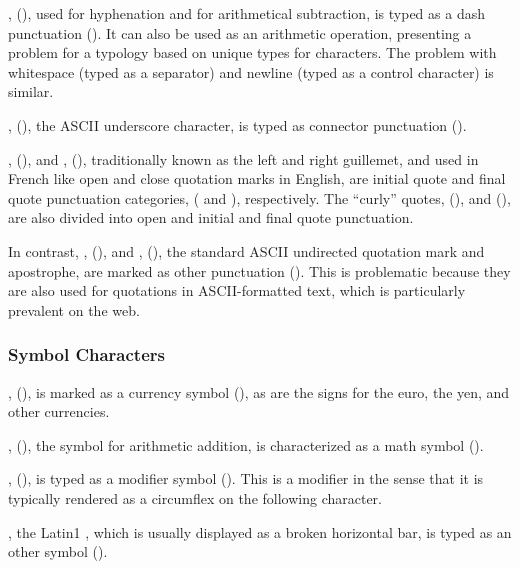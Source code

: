 ,  (\charmention{-}), used for
hyphenation and for arithmetical subtraction, is typed as a dash
punctuation ().  It can also be used as an arithmetic
operation, presenting a problem for a typology based on unique types
for characters. The problem with whitespace (typed as a separator) and
newline (typed as a control character) is similar.

,  (\charmention{\_}), the ASCII
underscore character, is typed as connector punctuation ().

,  (\charmention{<<}), and ,
(\charmention{>>}), traditionally known as the left and right
guillemet, and used in French like open and close quotation marks in
English, are initial quote and final quote punctuation categories,
( and ), respectively.  The ``curly'' quotes,
 (), and 
(), are also divided into open and initial and final
quote punctuation.

In contrast, , 
(), and , 
(), the standard ASCII undirected quotation mark and
apostrophe, are marked as other punctuation ().  This
is problematic because they are also used for quotations in
ASCII-formatted text, which is particularly prevalent on the web.

\subsubsection{Symbol Characters}

,  (\charmention{\$}), is
marked as a currency symbol (), as are the signs for the
euro, the yen, and other currencies.

,  (\charmention{+}), the symbol
for arithmetic addition, is characterized as a math symbol
().

,  (\charmention{\^{}}),
is typed as a modifier symbol ().  This is a modifier in the
sense that it is typically rendered as a circumflex on the following
character.

, the Latin1 , which is usually
displayed as a broken horizontal bar, is typed as an other symbol
().


